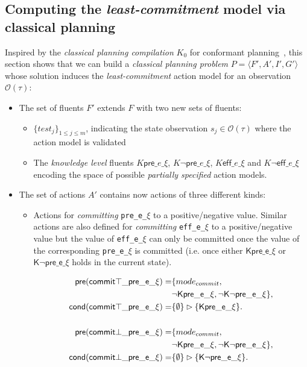 \documentclass{article}
\newcommand{\tup}[1]{{\langle #1 \rangle}}
\newcommand{\pre}{\mathsf{pre}}     %
\newcommand{\eff}{\mathsf{eff}}     %
\newcommand{\cond}{\mathsf{cond}}   %
\begin{document}
\subsection{Computing the {\em least-commitment} model via classical planning}
Inspired by the {\em classical planning compilation} $K_0$ for conformant planning~\cite{palacios-conformant-JAIR09}, this section shows that we can build a {\em classical planning problem} $P=\tup{F',A',I',G'}$ whose solution induces the {\em least-commitment} action model for an observation $\mathcal{O}(\tau)$: 
\begin{itemize}
\item The set of fluents $F'$ extends $F$ with two new sets of fluents:
      \begin{itemize}
      \item $\{test_j\}_{1\leq j\leq m}$, indicating the state observation $s_j\in\mathcal{O}(\tau)$ where the action model is validated
      \item The {\em knowledge level} fluents {\tt\small $K\pre\_e\_\xi$}, {\tt\small $K\neg\pre\_e\_\xi$}, {\tt\small $K\eff\_e\_\xi$} and {\tt\small $K\neg\eff\_e\_\xi$} encoding the space of possible {\em partially specified} action models.
      \end {itemize}
\item The set of actions $A'$ contains now actions of three different kinds:
\begin{itemize}
      \item Actions for {\em committing} {\tt\small pre\_e\_$\xi$} to a positive/negative value. Similar actions are also defined for {\em committing} {\tt\small eff\_e\_$\xi$} to a positive/negative value but the value of {\tt\small eff\_e\_$\xi$} can only be committed once the value of the corresponding {\tt\small pre\_e\_$\xi$} is committed (i.e. once either $\mathsf{K\pre\_e\_\xi}$ or $\mathsf{K\neg\pre\_e\_\xi}$ holds in the current state).
\begin{small}
\begin{align*}
\hspace*{7pt}\pre(\mathsf{commit\top\_pre\_e\_\xi})=&\{mode_{commit}, \\
&\mathsf{\neg K\pre\_e\_\xi}, \mathsf{\neg K\neg\pre\_e\_\xi}\},\\
\cond(\mathsf{commit\top\_pre\_e\_\xi})=&\{\emptyset\}\rhd\{\mathsf{K\pre\_e\_\xi}\}.\\\\
\hspace*{7pt}\pre(\mathsf{commit\bot\_pre\_e\_\xi})=&\{mode_{commit}, \\
&\mathsf{\neg K\pre\_e\_\xi},\mathsf{\neg K\neg\pre\_e\_\xi}\},\\
\cond(\mathsf{commit\bot\_pre\_e\_\xi})=&\{\emptyset\}\rhd\{\mathsf{K\neg\pre\_e\_\xi}\}.
\end{align*}
\end{small}


\end{itemize}
\end{itemize}
\end{document}
